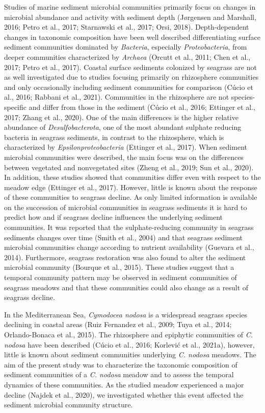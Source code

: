 \documentclass[12pt,]{article}
\begin{document}
Studies of marine sediment microbial communities primarily focus on
changes in microbial abundance and activity with sediment depth
(Jørgensen and Marshall, 2016; Petro et al., 2017; Starnawski et al.,
2017; Orsi, 2018). Depth-dependent changes in taxonomic composition have
been well described differentiating surface sediment communities
dominated by \emph{Bacteria}, especially \emph{Proteobacteria}, from
deeper communities characterized by \emph{Archaea} (Orcutt et al., 2011;
Chen et al., 2017; Petro et al., 2017). Coastal surface sediments
colonized by seagrass are not as well investigated due to studies
focusing primarily on rhizosphere communities and only occasionally
including sediment communities for comparison (Cúcio et al., 2016;
Rabbani et al., 2021). Communities in the rhizosphere are not
species-specific and differ from those in the sediment (Cúcio et al.,
2016; Ettinger et al., 2017; Zhang et al., 2020). One of the main
differences is the higher relative abundance of \emph{Desulfobacterota},
one of the most abundant sulphate reducing bacteria in seagrass
sediments, in contrast to the rhizosphere, which is characterized by
\emph{Epsilonproteobacteria} (Ettinger et al., 2017). When sediment
microbial communities were described, the main focus was on the
differences between vegetated and nonvegetated sites (Zheng et al.,
2019; Sun et al., 2020). In addition, these studies showed that
communities differ even with respect to the meadow edge (Ettinger et
al., 2017). However, little is known about the response of these
communities to seagrass decline. As only limited information is
available on the succession of microbial communities in seagrass
sediments it is hard to predict how and if seagrass decline influences
the underlying sediment communities. It was reported that the
sulphate-reducing community in seagrass sediments changes over time
(Smith et al., 2004) and that seagrass sediment microbial communities
change according to nutrient availability (Guevara et al., 2014).
Furthermore, seagrass restoration was also found to alter the sediment
microbial community (Bourque et al., 2015). These studies suggest that a
temporal community pattern may be observed in sediment communities of
seagrass meadows and that these communities could also change as a
result of seagrass decline.

In the Mediterranean Sea, \emph{Cymodocea nodosa} is a widespread
seagrass species declining in coastal areas (Ruiz Fernandez et al.,
2009; Tuya et al., 2014; Orlando-Bonaca et al., 2015). The rhizosphere
and epiphytic communities of \emph{C. nodosa} have been described (Cúcio
et al., 2016; Korlević et al., 2021a), however, little is known about
sediment communities underlying \emph{C. nodosa} meadows. The aim of the
present study was to characterize the taxonomic composition of sediment
communities of a \emph{C. nodosa} meadow and to assess the temporal
dynamics of these communities. As the studied meadow experienced a major
decline (Najdek et al., 2020), we investigated whether this event
affected the sediment microbial community structure.
\end{document}
